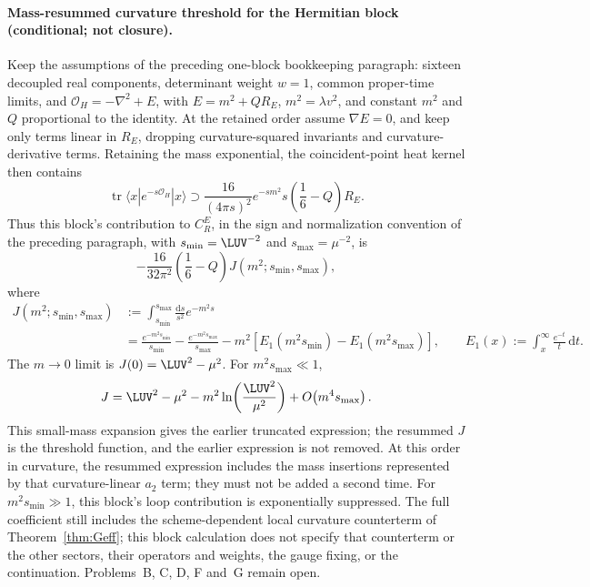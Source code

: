 \paragraph{Mass-resummed curvature threshold for the Hermitian block
(conditional; not closure).}
Keep the assumptions of the preceding one-block bookkeeping paragraph:
sixteen decoupled real components, determinant weight \(w=1\), common
proper-time limits, and
\(\mathcal O_H=-\nabla^2+E\), with
\(E=m^2+Q R_E\), \(m^2=\lambda v^2\), and constant \(m^2\) and \(Q\)
proportional to the identity. At the retained order assume
\(\nabla E=0\), and keep only terms linear in \(R_E\), dropping
curvature-squared invariants and curvature-derivative terms. Retaining
the mass exponential, the coincident-point heat kernel then contains
\[
\operatorname{tr}\langle x|e^{-s\mathcal O_H}|x\rangle
\supset
\frac{16}{(4\pi s)^2}e^{-sm^2}
s\left(\frac16-Q\right)R_E .
\]
Thus this block's contribution to \(C_R^E\), in the sign and
normalization convention of the preceding paragraph, with
\(s_{\min}=\LUV^{-2}\) and \(s_{\max}=\mu^{-2}\), is
\[
-\frac{16}{32\pi^2}\left(\frac16-Q\right)
J(m^2;s_{\min},s_{\max}),
\]
where
\[
\begin{aligned}
J(m^2;s_{\min},s_{\max})
&:=\int_{s_{\min}}^{s_{\max}}\frac{\mathrm{d}s}{s^2}e^{-m^2s}\\
&=\frac{e^{-m^2s_{\min}}}{s_{\min}}
 -\frac{e^{-m^2s_{\max}}}{s_{\max}}
 -m^2\left[
 E_1(m^2s_{\min})-E_1(m^2s_{\max})
 \right],
\qquad
E_1(x):=\int_x^\infty\frac{e^{-t}}{t}\,\mathrm{d}t .
\end{aligned}
\]
The \(m\to0\) limit is \(J(0)=\LUV^2-\mu^2\). For
\(m^2s_{\max}\ll1\),
\[
J=\LUV^2-\mu^2
 -m^2\ln\!\left(\frac{\LUV^2}{\mu^2}\right)
 +O\!\left(m^4s_{\max}\right).
\]
This small-mass expansion gives the earlier truncated expression;
the resummed \(J\) is the threshold function, and the earlier
expression is not removed. At this order in curvature, the resummed
expression includes the mass insertions represented by that
curvature-linear \(a_2\) term; they must not be added a second time.
For \(m^2s_{\min}\gg1\), this block's loop contribution is
exponentially suppressed. The full coefficient still includes the
scheme-dependent local curvature counterterm of
Theorem~\ref{thm:Geff}; this block calculation does not specify that
counterterm or the other sectors, their operators and weights, the
gauge fixing, or the continuation. Problems~B, C, D, F and~G remain
open.
